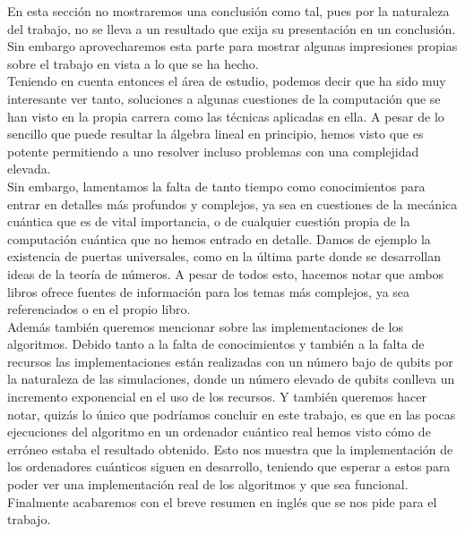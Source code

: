 \documentclass[a4paper]{article}
\numberwithin{equation}{section}
\begin{document}
En esta sección no mostraremos una conclusión como tal, pues por la naturaleza del trabajo, no se lleva a un resultado que exija su presentación en un conclusión.\\
Sin embargo aprovecharemos esta parte para mostrar algunas impresiones propias sobre el trabajo en vista a lo que se ha hecho.\\
\linebreak
Teniendo en cuenta entonces el área de estudio, podemos decir que ha sido muy interesante ver tanto, soluciones a algunas cuestiones de la computación que se han visto en la propia carrera como las técnicas aplicadas en ella. A pesar de lo sencillo que puede resultar la álgebra lineal en principio, hemos visto que es potente permitiendo a uno resolver incluso problemas con una complejidad elevada.\\
\linebreak
Sin embargo, lamentamos la falta de tanto tiempo como conocimientos para entrar en detalles más profundos y complejos, ya sea en cuestiones de la mecánica cuántica que es de vital importancia, o de cualquier cuestión propia de la computación cuántica que no hemos entrado en detalle. Damos de ejemplo la existencia de puertas universales, como en la última parte donde se desarrollan ideas de la teoría de números. A pesar de todos esto, hacemos notar que ambos libros ofrece fuentes de información para los temas más complejos, ya sea referenciados o en el propio libro.\\
\linebreak
Además también queremos mencionar sobre las implementaciones de los algoritmos. Debido tanto a la falta de conocimientos y también a la falta de recursos las implementaciones están realizadas con un número bajo de qubits por la naturaleza de las simulaciones, donde un número elevado de qubits conlleva un incremento exponencial en el uso de los recursos. Y también queremos hacer notar, quizás lo único que podríamos concluir en este trabajo, es que en las pocas ejecuciones del algoritmo en un ordenador cuántico real hemos visto cómo de erróneo estaba el resultado obtenido. Esto nos muestra que la implementación de los ordenadores cuánticos siguen en desarrollo, teniendo que esperar a estos para poder ver una implementación real de los algoritmos y que sea funcional.\\
\linebreak
Finalmente acabaremos con el breve resumen en inglés que se nos pide para el trabajo.
\end{document}
